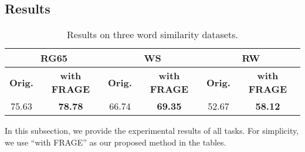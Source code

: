 \documentclass{article}
\begin{document}
\subsection{Results}
\begin{table}[htbp]
\begin{center}
		\begin{tabular}{c|c||c|c||c|c}
			\toprule
			\multicolumn{2}{c||}{\bf RG65} & \multicolumn{2}{c||}{\bf WS} & \multicolumn{2}{c}{\bf RW} \\
            \hline
            \bf Orig. & \bf  with FRAGE & \bf Orig. & \bf with FRAGE & \bf Orig. & \bf  with FRAGE\\
            \hline
            75.63 & \bf 78.78 & 66.74 & \bf 69.35 & 52.67 & \bf 58.12\\
            \bottomrule
		\end{tabular}
	\end{center}
\caption{\label{Emb-table} Results on three word similarity datasets.}
\end{table}
In this subsection, we provide the experimental results of all tasks. For simplicity, we use ``with FRAGE'' as our proposed method in the tables.
\end{document}
